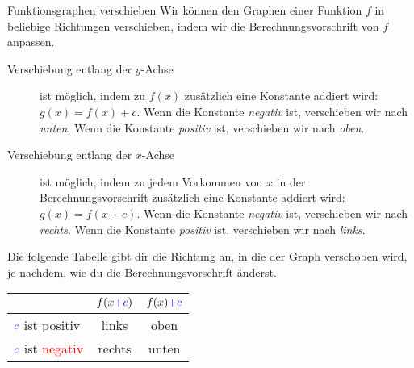 \documentclass[../../main.tex]{subfiles}
\begin{document}
\begin{nutshell}{Funktionsgraphen verschieben}
    Wir können den Graphen einer Funktion $f$ in beliebige Richtungen verschieben, indem wir die Berechnungsvorschrift von $f$ anpassen.
    \begin{description}
        \item[Verschiebung entlang der $y$-Achse] ist möglich, indem zu $f(x)$ zusätzlich eine Konstante addiert wird: $g(x) = f(x)+c$. Wenn die Konstante \emph{negativ} ist, verschieben wir nach \emph{unten}. Wenn die Konstante \emph{positiv} ist, verschieben wir nach \emph{oben}.
        \item[Verschiebung entlang der $x$-Achse] ist möglich, indem zu jedem Vorkommen von $x$ in der Berechnungsvorschrift zusätzlich eine Konstante addiert wird: $g(x) = f(x+c)$. Wenn die Konstante \emph{negativ} ist, verschieben wir nach \emph{rechts}. Wenn die Konstante \emph{positiv} ist, verschieben wir nach \emph{links}.
    \end{description}
    Die folgende Tabelle gibt dir die Richtung an, in die der Graph verschoben wird, je nachdem, wie du die Berechnungsvorschrift änderst.
    \begin{center}
        \begin{tabular}{l||cc}
             & $f(x\textcolor{blue}{+c})$ & $f(x)\textcolor{blue}{ + c}$\\\hline\hline
            $\color{blue} c$ ist \textcolor{green!50!black}{positiv} & links & oben\\
            $\color{blue} c$ ist \textcolor{red}{negativ} & rechts & unten\\
        \end{tabular}
    \end{center}
\end{nutshell}
\end{document}
